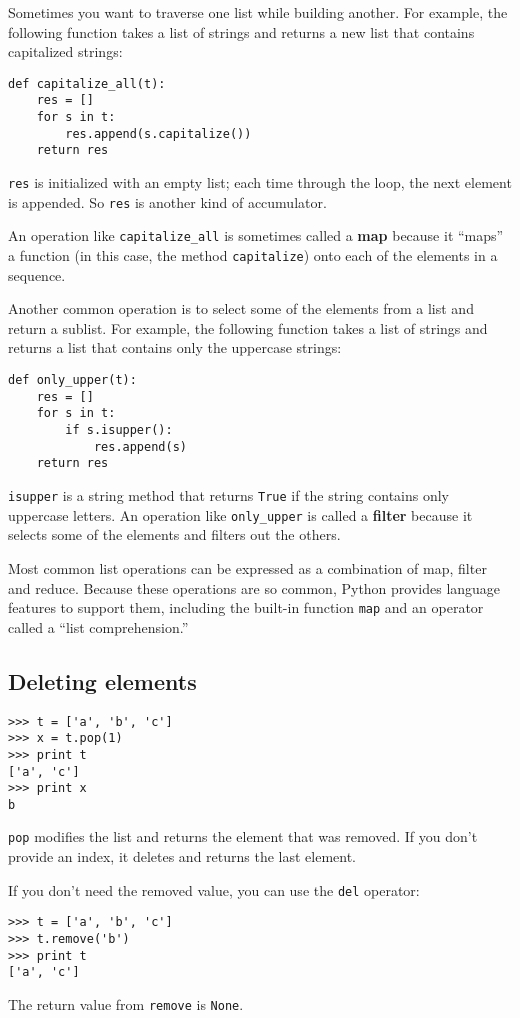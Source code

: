 \documentclass{article}
\begin{document}
Sometimes you want to traverse one list while building another. For
example, the following function takes a list of strings and returns a new
list that contains capitalized strings:
\begin{lstlisting}
def capitalize_all(t):
    res = []
    for s in t:
        res.append(s.capitalize())
    return res
\end{lstlisting}
\verb|res| is initialized with an empty list; each time through the loop,
the next element is appended. So \verb|res| is another kind of accumulator.

An operation like \verb|capitalize_all| is sometimes called a \textbf{map}
because it ``maps'' a function (in this case, the method \verb|capitalize|)
onto each of the elements in a sequence.

Another common operation is to select some of the elements from a list and
return a sublist. For example, the following function takes a list of
strings and returns a list that contains only the uppercase strings:
\begin{lstlisting}
def only_upper(t):
    res = []
    for s in t:
        if s.isupper():
            res.append(s)
    return res
\end{lstlisting}
\verb|isupper| is a \textcolor{bred}{string method} that returns \verb|True| if the
string contains only uppercase letters. An operation like \verb|only_upper| is
called a \textbf{filter} because it selects some of the elements and filters out the
others.

Most common list operations can be expressed as a combination of map,
filter and reduce. Because these operations are so common, Python provides
language features to support them, including the built-in function \verb|map| and
an operator called a ``list comprehension.''

\subsection{Deleting elements}
\begin{lstlisting}
>>> t = ['a', 'b', 'c']
>>> x = t.pop(1)
>>> print t
['a', 'c']
>>> print x
b
\end{lstlisting}
\verb|pop| modifies the list and returns the element that was removed. If you
don’t provide an index, it deletes and returns the last element.

If you don’t need the removed value, you can use the \verb|del| operator:
\begin{lstlisting}
>>> t = ['a', 'b', 'c']
>>> t.remove('b')
>>> print t
['a', 'c']
\end{lstlisting}
The return value from \verb|remove| is \verb|None|.
\end{document}
